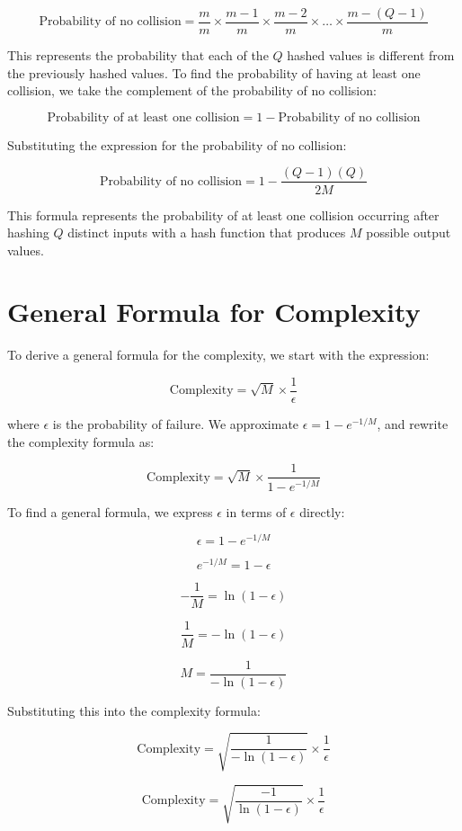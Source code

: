 \documentclass[11pt]{article}
\begin{document}
\[
\text{Probability of no collision} = \frac{m}{m} \times \frac{m-1}{m} \times \frac{m-2}{m} \times \ldots \times \frac{m-(Q-1)}{m}
\]

This represents the probability that each of the \( Q \) hashed values is different from the previously hashed values. To find the probability of having at least one collision, we take the complement of the probability of no collision:

\[
\text{Probability of at least one collision} = 1 - \text{Probability of no collision}
\]

Substituting the expression for the probability of no collision:

\[
\text{Probability of no collision} = 1 - \frac{(Q-1)(Q)}{2M}
\]

This formula represents the probability of at least one collision occurring after hashing \( Q \) distinct inputs with a hash function that produces \( M \) possible output values.

\section{General Formula for Complexity}

To derive a general formula for the complexity, we start with the expression:

\[ \text{Complexity} = \sqrt{M} \times \frac{1}{\epsilon} \]

where \( \epsilon \) is the probability of failure. We approximate \( \epsilon = 1 - e^{-1/M} \), and rewrite the complexity formula as:

\[ \text{Complexity} = \sqrt{M} \times \frac{1}{1 - e^{-1/M}} \]

To find a general formula, we express \( \epsilon \) in terms of \( \epsilon \) directly:

\[ \epsilon = 1 - e^{-1/M} \]

\[ e^{-1/M} = 1 - \epsilon \]

\[ -\frac{1}{M} = \ln(1 - \epsilon) \]

\[ \frac{1}{M} = -\ln(1 - \epsilon) \]

\[ M = \frac{1}{-\ln(1 - \epsilon)} \]

Substituting this into the complexity formula:

\[ \text{Complexity} = \sqrt{\frac{1}{-\ln(1 - \epsilon)}} \times \frac{1}{\epsilon} \]

\[ \text{Complexity} = \sqrt{\frac{-1}{\ln(1 - \epsilon)}} \times \frac{1}{\epsilon} \]
\end{document}
